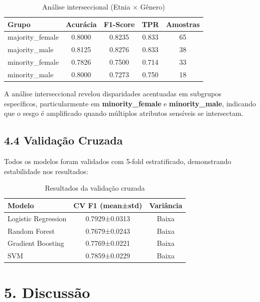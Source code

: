 \documentclass[12pt,a4paper]{article}
\begin{document}
\begin{table}[H]
\centering
\caption{Análise interseccional (Etnia $\times$ Gênero)}
\begin{tabular}{lcccc}
\toprule
\textbf{Grupo} & \textbf{Acurácia} & \textbf{F1-Score} & \textbf{TPR} & \textbf{Amostras} \\
\midrule
majority\_female & 0.8000 & 0.8235 & 0.833 & 65 \\
majority\_male & 0.8125 & 0.8276 & 0.833 & 38 \\
minority\_female & 0.7826 & 0.7500 & 0.714 & 33 \\
minority\_male & 0.8000 & 0.7273 & 0.750 & 18 \\
\bottomrule
\end{tabular}
\label{tab:intersectional}
\end{table}

A análise interseccional revelou disparidades acentuadas em subgrupos 
específicos, particularmente em \textbf{minority\_female} e 
\textbf{minority\_male}, indicando que o sesgo é amplificado quando 
múltiplos atributos sensíveis se intersectam.

\subsection{4.4 Validação Cruzada}

Todos os modelos foram validados com 5-fold estratificado, demonstrando 
estabilidade nos resultados:

\begin{table}[H]
\centering
\caption{Resultados da validação cruzada}
\begin{tabular}{lcc}
\toprule
\textbf{Modelo} & \textbf{CV F1 (mean±std)} & \textbf{Variância} \\
\midrule
Logistic Regression & 0.7929±0.0313 & Baixa \\
Random Forest & 0.7679±0.0243 & Baixa \\
Gradient Boosting & 0.7769±0.0221 & Baixa \\
SVM & 0.7859±0.0229 & Baixa \\
\bottomrule
\end{tabular}
\label{tab:cross_validation}
\end{table}

\section{5. Discussão}
\end{document}
